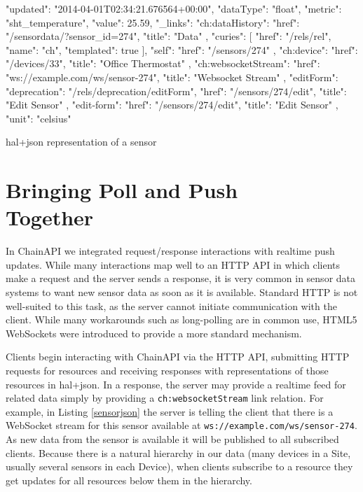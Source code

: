 \documentclass{acm_proc_article-sp}
\begin{document}
\begin{listing}
\begin{jsoncode}
  {
    "updated": "2014-04-01T02:34:21.676564+00:00",
    "dataType": "float",
    "metric": "sht_temperature",
    "value": 25.59,
    "_links": {
      "ch:dataHistory": {
        "href": "/sensordata/?sensor_id=274",
        "title": "Data"
      },
      "curies": [
        {
          "href": "/rels/{rel}",
          "name": "ch",
          "templated": true
        }
      ],
      "self": {
        "href": "/sensors/274"
      },
      "ch:device": {
        "href": "/devices/33",
        "title": "Office Thermostat"
      },
      "ch:websocketStream": {
        "href": "ws://example.com/ws/sensor-274",
        "title": "Websocket Stream"
      },
      "editForm": {
        "deprecation": "/rels/deprecation/editForm",
        "href": "/sensors/274/edit",
        "title": "Edit Sensor"
      },
      "edit-form": {
        "href": "/sensors/274/edit",
        "title": "Edit Sensor"
      }
    },
    "unit": "celsius"
  }
\end{jsoncode}
\caption{hal+json representation of a sensor}
\label{sensorjson}
\end{listing}

\section{Bringing Poll and Push\\ Together}

In ChainAPI we integrated request/response interactions with realtime push
updates. While many interactions map well to an HTTP API in which clients make
a request and the server sends a response, it is very common in sensor data
systems to want new sensor data as soon as it is available.  Standard HTTP is
not well-suited to this task, as the server cannot initiate communication with
the client. While many workarounds such as long-polling are in common use,
HTML5 WebSockets were introduced to provide a more standard mechanism.

Clients begin interacting with ChainAPI via the HTTP API, submitting HTTP
requests for resources and receiving responses with representations of those
resources in hal+json. In a response, the server may provide a realtime feed
for related data simply by providing a \texttt{ch:websocketStream} link
relation. For example, in Listing \ref{sensorjson} the server is telling the
client that there is a WebSocket stream for this sensor available at
\texttt{ws://example.com/ws/sensor-274}. As new data from the sensor is
available it will be published to all subscribed clients. Because there is a
natural hierarchy in our data (many devices in a Site, usually several sensors
in each Device), when clients subscribe to a resource they get updates for all
resources below them in the hierarchy.
\end{document}
